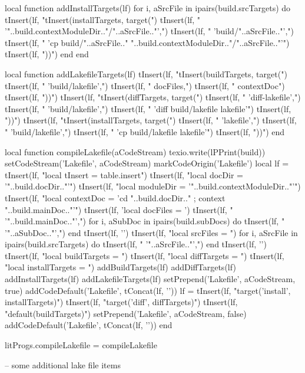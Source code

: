 local function addInstallTargets(lf)
  for i, aSrcFile in ipairs(build.srcTargets) do
    tInsert(lf, "tInsert(installTargets, target(")
    tInsert(lf, "  '"..build.contextModuleDir.."/"..aSrcFile.."',")
    tInsert(lf, "  'build/"..aSrcFile.."',")
    tInsert(lf, "  'cp build/"..aSrcFile.." "..build.contextModuleDir.."/"..aSrcFile.."'")
    tInsert(lf, "))\n")
  end
end

local function addLakefileTargets(lf)
  tInsert(lf, "tInsert(buildTargets, target(")
  tInsert(lf, "  'build/lakefile',")
  tInsert(lf, "  docFiles,")
  tInsert(lf, "  contextDoc")
  tInsert(lf, "))\n")
  tInsert(lf, "tInsert(diffTargets, target(")
  tInsert(lf, "  'diff-lakefile',")
  tInsert(lf, "  'build/lakefile',")
  tInsert(lf, "  'diff build/lakefile lakefile'")
  tInsert(lf, "))\n")
  tInsert(lf, "tInsert(installTargets, target(")
  tInsert(lf, "  'lakefile',")
  tInsert(lf, "  'build/lakefile',")
  tInsert(lf, " 'cp build/lakefile lakefile'")
  tInsert(lf, "))\n")
end

local function compileLakefile(aCodeStream)
  texio.write(lPPrint(build))
  setCodeStream('Lakefile', aCodeStream)
  markCodeOrigin('Lakefile')
  local lf = {}
  tInsert(lf, "local tInsert    = table.insert\n")
  tInsert(lf, "local docDir     = '"..build.docDir.."'")
  tInsert(lf, "local moduleDir  = '"..build.contextModuleDir.."'\n")
  tInsert(lf, "local contextDoc = 'cd "..build.docDir.." ; context "..build.mainDoc.."'\n")
  tInsert(lf, 'local docFiles = {')
  tInsert(lf, "  '"..build.mainDoc.."',")
  for i, aSubDoc in ipairs(build.subDocs) do
    tInsert(lf, "  '"..aSubDoc.."',")
  end
  tInsert(lf, '}\n')
  tInsert(lf, "local srcFiles = {")
  for i, aSrcFile in ipairs(build.srcTargets) do
    tInsert(lf, "  '"..aSrcFile.."',")
  end
  tInsert(lf, '}\n')
  tInsert(lf, "local buildTargets   = {}")
  tInsert(lf, "local diffTargets    = {}")
  tInsert(lf, "local installTargets = {}\n")
  addBuildTargets(lf)
  addDiffTargets(lf)
  addInstallTargets(lf)
  addLakefileTargets(lf)
  setPrepend('Lakefile', aCodeStream, true)
  addCodeDefault('Lakefile', tConcat(lf, '\n'))
  lf = {}
  tInsert(lf, "target('install', installTargets)")
  tInsert(lf, "target('diff', diffTargets)")
  tInsert(lf, "default(buildTargets)")
  setPrepend('Lakefile', aCodeStream, false)
  addCodeDefault('Lakefile', tConcat(lf, '\n'))
end

litProgs.compileLakefile = compileLakefile
\stopLuaCode

\startLakefile
-- some additional lake file items
\stopLakefile

\stopchapter